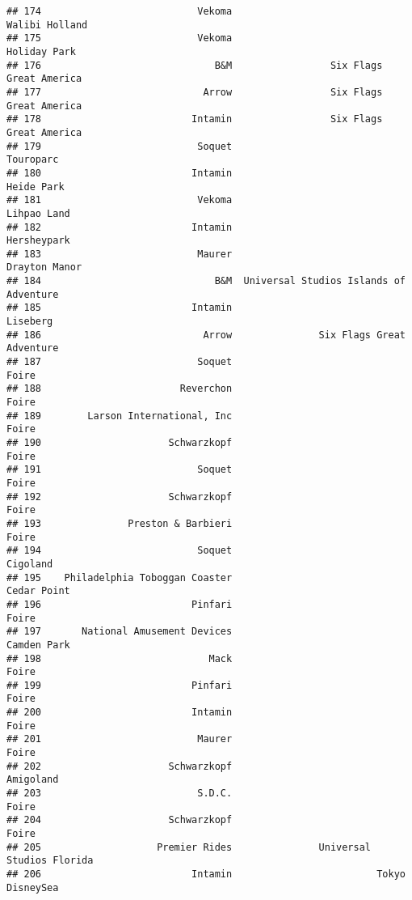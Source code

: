 \documentclass[
]{article}
\begin{document}
\begin{verbatim}
## 174                           Vekoma                          Walibi Holland
## 175                           Vekoma                            Holiday Park
## 176                              B&M                 Six Flags Great America
## 177                            Arrow                 Six Flags Great America
## 178                          Intamin                 Six Flags Great America
## 179                           Soquet                               Touroparc
## 180                          Intamin                              Heide Park
## 181                           Vekoma                             Lihpao Land
## 182                          Intamin                             Hersheypark
## 183                           Maurer                           Drayton Manor
## 184                              B&M  Universal Studios Islands of Adventure
## 185                          Intamin                                Liseberg
## 186                            Arrow               Six Flags Great Adventure
## 187                           Soquet                                   Foire
## 188                        Reverchon                                   Foire
## 189        Larson International, Inc                                   Foire
## 190                      Schwarzkopf                                   Foire
## 191                           Soquet                                   Foire
## 192                      Schwarzkopf                                   Foire
## 193               Preston & Barbieri                                   Foire
## 194                           Soquet                                Cigoland
## 195    Philadelphia Toboggan Coaster                             Cedar Point
## 196                          Pinfari                                   Foire
## 197       National Amusement Devices                             Camden Park
## 198                             Mack                                   Foire
## 199                          Pinfari                                   Foire
## 200                          Intamin                                   Foire
## 201                           Maurer                                   Foire
## 202                      Schwarzkopf                               Amigoland
## 203                           S.D.C.                                   Foire
## 204                      Schwarzkopf                                   Foire
## 205                    Premier Rides               Universal Studios Florida
## 206                          Intamin                         Tokyo DisneySea

\end{verbatim}
\end{document}
